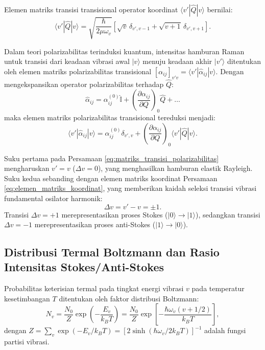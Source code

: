 Elemen matriks transisi transisional operator koordinat $\langle v' | \hat{Q} | v \rangle$ bernilai:
\begin{equation}
\langle v' | \hat{Q} | v \rangle = \sqrt{\frac{\hbar}{2\mu\omega_v}} \left[ \sqrt{v} \, \delta_{v', v - 1} + \sqrt{v + 1} \, \delta_{v', v + 1} \right].
\label{eq:elemen_matriks_koordinat}
\end{equation}

Dalam teori polarizabilitas terinduksi kuantum, intensitas hamburan Raman untuk transisi dari keadaan vibrasi awal $|v\rangle$ menuju keadaan akhir $|v'\rangle$ ditentukan oleh elemen matriks polarizabilitas transisional $[\alpha_{ij}]_{v'v} = \langle v' | \hat{\alpha}_{ij} | v \rangle$. Dengan mengekspansikan operator polarizabilitas terhadap $\hat{Q}$:
\begin{equation}
\hat{\alpha}_{ij} = \alpha_{ij}^{(0)} \hat{\mathbb{I}} + \left( \frac{\partial \alpha_{ij}}{\partial Q} \right)_0 \hat{Q} + \dots
\end{equation}
maka elemen matriks polarizabilitas transisional tereduksi menjadi:
\begin{equation}
\langle v' | \hat{\alpha}_{ij} | v \rangle = \alpha_{ij}^{(0)} \delta_{v', v} + \left( \frac{\partial \alpha_{ij}}{\partial Q} \right)_0 \langle v' | \hat{Q} | v \rangle.
\label{eq:matriks_transisi_polarizabilitas}
\end{equation}

Suku pertama pada Persamaan \eqref{eq:matriks_transisi_polarizabilitas} mengharuskan $v' = v$ ($\Delta v = 0$), yang menghasilkan hamburan elastik Rayleigh. Suku kedua sebanding dengan elemen matriks koordinat Persamaan \eqref{eq:elemen_matriks_koordinat}, yang memberikan kaidah seleksi transisi vibrasi fundamental osilator harmonik:
\begin{equation}
\Delta v = v' - v = \pm 1.
\label{eq:kaidah_seleksi_vibrasi}
\end{equation}
Transisi $\Delta v = +1$ merepresentasikan proses Stokes ($|0\rangle \to |1\rangle$), sedangkan transisi $\Delta v = -1$ merepresentasikan proses anti-Stokes ($|1\rangle \to |0\rangle$).

\subsection{Distribusi Termal Boltzmann dan Rasio Intensitas Stokes/Anti-Stokes}
Probabilitas keterisian termal pada tingkat energi vibrasi $v$ pada temperatur kesetimbangan $T$ ditentukan oleh faktor distribusi Boltzmann:
\begin{equation}
N_v = \frac{N_0}{Z} \exp\left( - \frac{E_v}{k_B T} \right) = \frac{N_0}{Z} \exp\left[ - \frac{\hbar\omega_v (v + 1/2)}{k_B T} \right],
\label{eq:boltzmann}
\end{equation}
dengan $Z = \sum_v \exp(-E_v/k_B T) = [2\sinh(\hbar\omega_v / 2k_B T)]^{-1}$ adalah fungsi partisi vibrasi.

